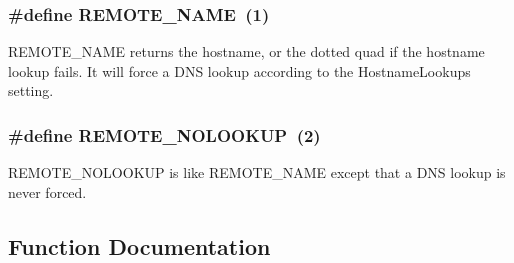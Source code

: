 \subsubsection[{\texorpdfstring{R\+E\+M\+O\+T\+E\+\_\+\+N\+A\+ME}{REMOTE_NAME}}]{\setlength{\rightskip}{0pt plus 5cm}\#define R\+E\+M\+O\+T\+E\+\_\+\+N\+A\+ME~(1)}\hypertarget{group__get__remote__host_ga58fce12ea2be474cd9c108db868d3035}{}\label{group__get__remote__host_ga58fce12ea2be474cd9c108db868d3035}
R\+E\+M\+O\+T\+E\+\_\+\+N\+A\+ME returns the hostname, or the dotted quad if the hostname lookup fails. It will force a D\+NS lookup according to the Hostname\+Lookups setting. 
\subsubsection[{\texorpdfstring{R\+E\+M\+O\+T\+E\+\_\+\+N\+O\+L\+O\+O\+K\+UP}{REMOTE_NOLOOKUP}}]{\setlength{\rightskip}{0pt plus 5cm}\#define R\+E\+M\+O\+T\+E\+\_\+\+N\+O\+L\+O\+O\+K\+UP~(2)}\hypertarget{group__get__remote__host_ga3d0c829d0d80f6481aaf7ad01e23f2e6}{}\label{group__get__remote__host_ga3d0c829d0d80f6481aaf7ad01e23f2e6}
R\+E\+M\+O\+T\+E\+\_\+\+N\+O\+L\+O\+O\+K\+UP is like R\+E\+M\+O\+T\+E\+\_\+\+N\+A\+ME except that a D\+NS lookup is never forced. 

\subsection{Function Documentation}
